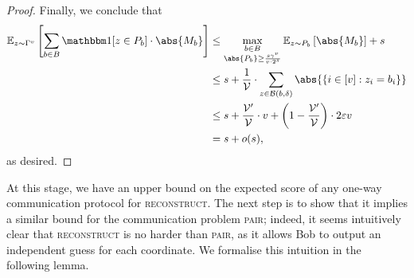 \documentclass[a4paper,UKenglish,cleveref, autoref, thm-restate]{lipics-v2021}
\theoremstyle{definition}
\newcommand{\E}{\mathbb E}
\renewcommand{\set}[1]{\left\{#1\right\}}
\newcommand{\eps}{\varepsilon}
\newcommand{\pair}{\normalfont\textsc{pair}\xspace}
\newcommand{\reconstruct}{\normalfont\textsc{reconstruct}\xspace}
\newcommand{\vcommitlength}{v}
\newcommand{\vcommitstring}{z}
\newcommand{\ball}{\mathcal B}
\newcommand{\alphabet}{\Gamma}
\newcommand{\alphabetsize}{\gamma}
\newcommand{\chf}{\mathbbm 1}
\begin{document}
\begin{proof}
    Finally, we conclude that
    \begin{align*}
        \E_{\vcommitstring \sim \alphabet^\vcommitlength}\left[\sum_{b \in B} \chf[\vcommitstring \in P_b] \cdot \abs{M_b}\right] &\leq \max_{\substack{b \in B\\\abs{P_b} \geq \frac{s \alphabetsize^\vcommitlength}{\vcommitlength \cdot 2^s}}} \E_{\vcommitstring \sim P_b}\left[\abs{M_b}\right] + s\\
        &\leq s + \frac1{\mathcal{V}} \cdot \sum_{\vcommitstring \in \ball(b, \delta)} \abs{\set{i \in [\vcommitlength] : \vcommitstring_i = b_i}}\\
        &\leq s +  \frac{\mathcal{V}'}{\mathcal{V}} \cdot \vcommitlength + \left(1 - \frac{\mathcal{V}'}{\mathcal{V}} \right) \cdot 2\eps \vcommitlength\\
        &= s + o(s),
    \end{align*}
    as desired.
\end{proof}

At this stage, we have an upper bound on the expected score of any one-way communication protocol for \reconstruct. The next step is to show that it implies a similar bound for the communication problem \pair; indeed, it seems intuitively clear that \reconstruct is no harder than \pair, as it allows Bob to output an independent guess for each coordinate. We formalise this intuition in the following lemma.
\end{document}
